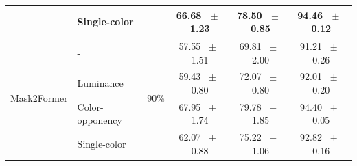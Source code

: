 \begin{table}[h]
\begin{tabular}{@{}l l c c c c@{}}
    & Single-color &  & 66.68 ~$\pm$~ 1.23 & 78.50 ~$\pm$~ 0.85 & 94.46 ~$\pm$~ 0.12 \\
    \midrule
    \multirow{4}{*}{Mask2Former} & - & \multirow{4}{*}{90\%} & 57.55 ~$\pm$~ 1.51 & 69.81 ~$\pm$~ 2.00 & 91.21 ~$\pm$~ 0.26 \\
    & Luminance &  & 59.43 ~$\pm$~ 0.80 & 72.07 ~$\pm$~ 0.80 & 92.01 ~$\pm$~ 0.20 \\
    & Color-opponency &  & 67.95 ~$\pm$~ 1.74 & 79.78 ~$\pm$~ 1.85 & 94.40 ~$\pm$~ 0.05 \\
    & Single-color &  & 62.07 ~$\pm$~ 0.88 & 75.22 ~$\pm$~ 1.06 & 92.82 ~$\pm$~ 0.16 \\
    \midrule
    \bottomrule
  \end{tabular}
  \label{tab:mask2former_cityscapes}
\end{table}